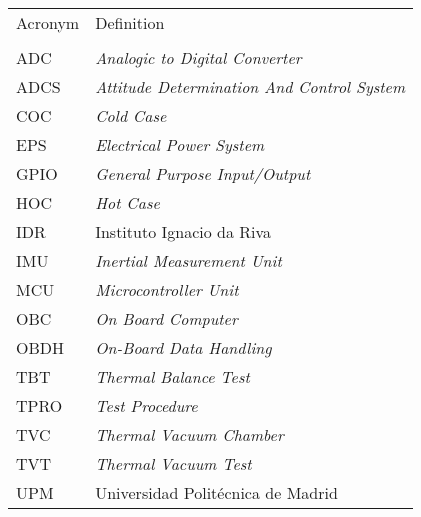 \begin{table}[H]
\centering
\begin{tabular}{ll}
Acronym   & Definition                                                \\
           &                                                            \\
ADC        & \textit{Analogic to Digital Converter }                             \\
ADCS       & \textit{Attitude Determination And Control System}                  \\
COC        & \textit{Cold Case}                  \\
EPS        & \textit{Electrical Power System}                                    \\
GPIO        & \textit{General Purpose Input/Output}                                        \\
HOC        & \textit{Hot Case}                  \\
IDR        & Instituto Ignacio da Riva                                  \\
IMU        & \textit{Inertial Measurement Unit }                                 \\
MCU        & \textit{Microcontroller Unit }                                      \\
OBC        & \textit{On Board Computer}                                          \\
OBDH       & \textit{On-Board Data Handling}                                     \\
TBT       & \textit{Thermal Balance Test}\\
TPRO       & \textit{Test Procedure}\\
TVC       & \textit{Thermal Vacuum Chamber}\\
TVT       & \textit{Thermal Vacuum Test}\\
UPM        & Universidad Politécnica de Madrid                         
\end{tabular}
\end{table}